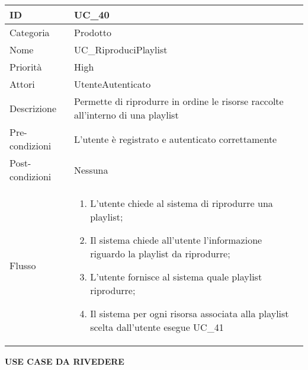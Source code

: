 \begin{center}
\begin{table}[bp]
\begin{tabular}{ |p{2cm}|p{13cm}|  }
\hline
ID & UC\_40\\\hline
Categoria & Prodotto \\\hline
Nome & UC\_RiproduciPlaylist\\\hline
Priorità & High \\\hline
Attori &  UtenteAutenticato \\\hline
Descrizione & Permette di riprodurre in ordine le risorse raccolte all'interno di una playlist\\\hline
Pre-condizioni & L'utente è registrato e autenticato correttamente\\\hline
Post-condizioni & Nessuna\\\hline
Flusso &  	\begin{enumerate}
		\item L'utente chiede al sistema di riprodurre una playlist;
		\item Il sistema chiede all'utente l'informazione riguardo la playlist da riprodurre;
		\item L'utente fornisce al sistema quale playlist riprodurre;
		\item Il sistema per ogni risorsa associata alla playlist scelta dall'utente esegue UC\_41
		\end{enumerate}\\\hline
\end{tabular}
\label{table_use_case:40}\newline


\textbf{USE CASE DA RIVEDERE} \newline


\end{table}


\end{center}

